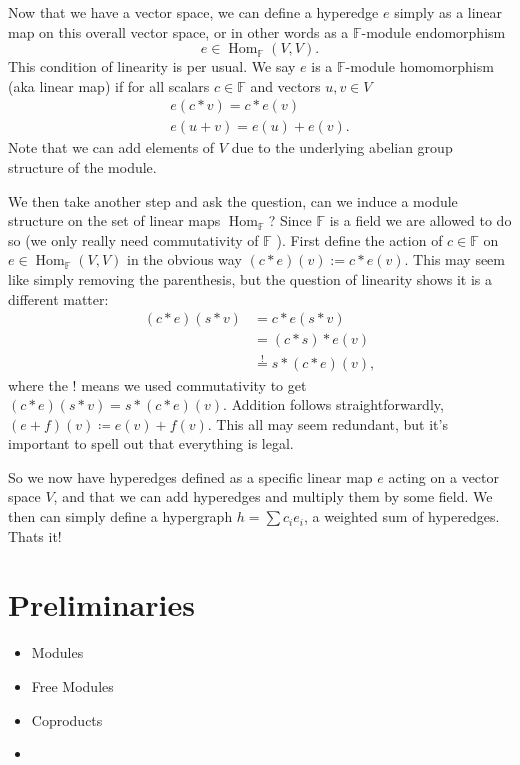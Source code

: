 \documentclass{article}
\newcommand{\field}{\mathbb{F}}
\DeclareMathOperator{\Hom}{Hom}
\begin{document}
Now that we have a vector space, we can define a hyperedge $e$ simply as a linear map on this overall vector space, or in other words as a $\field$-module endomorphism
\begin{equation}
    e \in \Hom_{\field} (V, V).
\end{equation}
This condition of linearity is per usual. We say $e$ is a $\field$-module homomorphism (aka linear map) if for all scalars $c \in \field$ and vectors $u, v \in V$
\begin{align}
    e(c * v) = c * e(v) \\
    e (u + v) = e(u) + e(v).
\end{align}
Note that we can add elements of $V$ due to the underlying abelian group structure of the module. 

We then take another step and ask the question, can we induce a module structure on the set of linear maps $\Hom_{\field}$? Since $\field$ is a field we are allowed to do so (we only really need commutativity of $\field$ ). First define the action of $c \in \field$ on $e \in \Hom_\field(V, V)$ in the obvious way $(c * e) (v) := c * e(v)$. This may seem like simply removing the parenthesis, but the question of linearity shows it is a different matter:
\begin{align}
    (c * e) (s * v) &= c * e( s * v) \\
    &= (c * s) * e(v) \\
    &\overset{!}{=} s * (c * e) (v),
\end{align}
where the ! means we used commutativity to get $(c *e) (s * v) = s * (c * e) (v)$. Addition follows straightforwardly, $(e+f) (v) \coloneqq e(v) + f(v)$. This all may seem redundant, but it's important to spell out that everything is legal.

So we now have hyperedges defined as a specific linear map $e$ acting on a vector space $V$, and that we can add hyperedges and multiply them by some field. We then can simply define a hypergraph $h = \sum c_i e_i$, a weighted sum of hyperedges. Thats it! 


\section{Preliminaries}
\begin{itemize}
    \item Modules
    \item Free Modules
    \item Coproducts
    \item 
\end{itemize}
\end{document}
